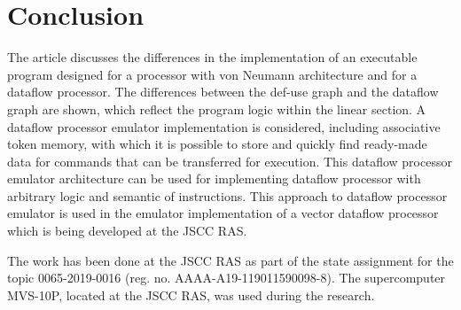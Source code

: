 \documentclass[
11pt,%
tightenlines,%
twoside,%
onecolumn,%
nofloats,%
nobibnotes,%
nofootinbib,%
superscriptaddress,%
noshowpacs,%
centertags]%
{revtex4}
\begin{document}
\section{Conclusion}

The article discusses the differences in the implementation of an executable program designed for a processor with von Neumann architecture and for a dataflow processor.
The differences between the def-use graph and the dataflow graph are shown, which reflect the program logic within the linear section.
A dataflow processor emulator implementation is considered, including associative token memory, with which it is possible to store and quickly find ready-made data for commands that can be transferred for execution.
This dataflow processor emulator architecture can be used for implementing dataflow processor with arbitrary logic and semantic of instructions.
This approach to dataflow processor emulator is used in the emulator implementation of a vector dataflow processor which is being developed at the JSCC RAS.

\begin{acknowledgments}
The work has been done at the JSCC RAS as part of the state assignment for the topic 0065-2019-0016 (reg. no. AAAA-A19-119011590098-8).
The supercomputer MVS-10P, located at the JSCC RAS, was used during the research.
\end{acknowledgments}
\end{document}

